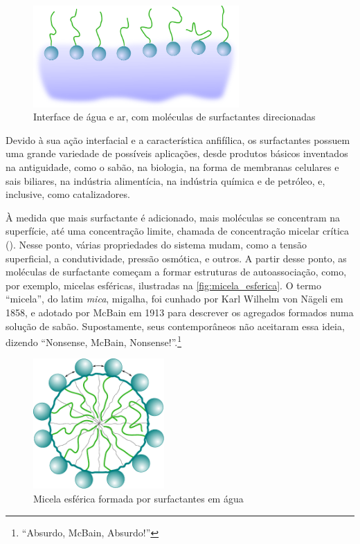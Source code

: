 	\begin{figure}[h]
		\centering
		\includegraphics[width=0.7\textwidth]{./imagens/introducao/superficie_surfactante}
		\caption{Interface de água e ar, com moléculas de surfactantes direcionadas}
		\label{fig:superficie_surfactante}
	\end{figure} 
		
	Devido à sua ação interfacial e a característica anfifílica, os surfactantes possuem uma grande variedade de possíveis aplicações, desde produtos básicos inventados na antiguidade, como o sabão\cite{Gibbs1939, Levey1954}, na biologia, na forma de membranas celulares e sais biliares\cite{Wennerstrom1979}, na indústria alimentícia\cite{Lauridsen1976}, na indústria química\cite{Balzer1999} e de petróleo\cite{Surfactants_petroleum}, e, inclusive, como catalizadores\cite{Minch1978a}.
	
	À medida que mais surfactante é adicionado, mais moléculas se concentram na superfície, até uma concentração limite, chamada de concentração micelar crítica (\cmc). Nesse ponto, várias propriedades do sistema mudam, como a tensão superficial, a condutividade, pressão osmótica, e outros.\cite{Lindman_livro}  A partir desse ponto, as moléculas de surfactante começam a formar estruturas de autoassociação, como, por exemplo, micelas esféricas, ilustradas na \autoref{fig:micela_esferica}.\cite{Lindman_livro} O termo ``micela'', do latim \emph{mica}, migalha, foi cunhado por Karl Wilhelm von Nägeli em 1858, e adotado por McBain em 1913 para descrever os agregados formados numa solução de sabão. Supostamente, seus contemporâneos não aceitaram essa ideia, dizendo ``Nonsense, McBain, Nonsense!''.\footnote{``Absurdo, McBain, Absurdo!''}\cite{Vincent2014} %
		
	\begin{figure}[h]
		\centering
		\includegraphics[width=5cm]{./imagens/introducao/micela_esferica}
		\caption{Micela esférica formada por surfactantes em água}
		\label{fig:micela_esferica}
	\end{figure}
	
